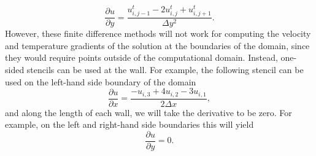 \begin{equation}
	\frac{\partial u}{\partial y} = \frac{u_{i,j-1}^t - 2 u_{i,j}^t + u_{i,j+1}^t}{\Delta y^2}.
\end{equation}
However, these finite difference methods will not work for computing the velocity and temperature gradients of the solution at the boundaries of the domain, since they would require points outside of the computational domain. Instead, one-sided stencils can be used at the wall. For example, the following stencil can be used on the left-hand side boundary of the domain
\begin{equation}
	\frac{\partial u}{\partial x} = \frac{-u_{i,3} + 4u_{i,2} - 3u_{i,1}}{2\Delta x},
\end{equation}
and along the length of each wall, we will take the derivative to be zero. For example, on the left and right-hand side boundaries this will yield
\begin{equation}
	\frac{\partial u}{\partial y} = 0.
\end{equation}